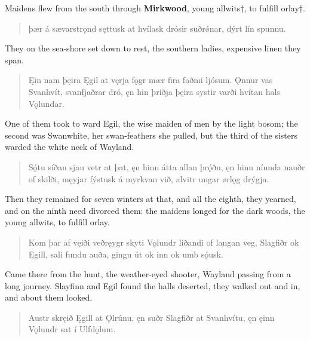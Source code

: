 \bvb Maidens flew from the south through \textbf{Mirkwood}, young allwits†, to fulfill orlay†. \\

\begin{verse}
\bva þær á sævarstrǫnd \hld sęttusk at hvílask
drósir suðrǿnar, \hld dýrt lín spunnu. \\%
\end{verse}

\bvb They on the sea-shore set down to rest, the southern ladies, expensive linen they span. \\

\begin{verse}
\bva Ęin nam þęira \hld Ęgil at vęrja
fǫgr mær fira \hld faðmi ljósum.
Ǫnnur vas Svanhvít, \hld svanfjaðrar dró,
ęn hin þriðja \hld þęira systir
varði hvítan \hld hals Vǫlundar. \\%
\end{verse}

\bvb One of them took to ward Egil, the wise maiden of men by the light bosom; the second was Swanwhite, her swan-feathers she pulled, but the third of the sisters warded the white neck of Wayland. \\

\begin{verse}
\bva Sǫ́tu síðan \hld sjau vetr at þat,
ęn hinn átta \hld allan þrǫ́ðu,
ęn hinn níunda \hld nauðr of skilði,
męyjar fýstusk \hld á myrkvan við,
alvitr ungar \hld ørlǫg drýgja. \\%
\end{verse}

\bvb Then they remained for seven winters at that, and all the eighth, they yearned, and on the ninth need divorced them: the maidens longed for the dark woods, the young allwits, to fulfill orlay. \\

\begin{verse}
\bva Kom þar af vęiði \hld veðręygr skyti
Vǫlundr líðandi \hld of langan veg,
Slagfiðr ok Ęgill, \hld sali fundu auða,
gingu út ok inn \hld ok umb sǫ́usk. \\%
\end{verse}

\bvb Came there from the hunt, the weather-eyed shooter, Wayland passing from a long journey. Slayfinn and Egil found the halls deserted, they walked out and in, and about them looked. \\

\begin{verse}
\bva Austr skręið Ęgill \hld at Ǫlrúnu,
ęn suðr Slagfiðr \hld at Svanhvítu,
ęn ęinn Vǫlundr \hld sat í Ulfdǫlum. \\%
\end{verse}

